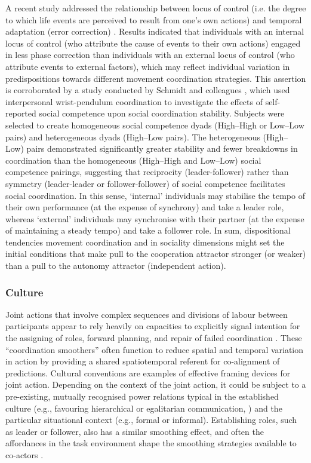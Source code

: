 \begin{CJK}{UTF8}{gbsn}
  A recent study addressed the relationship between locus of control (i.e. the degree to which life events are perceived to result from one’s own actions) and temporal adaptation (error correction) \citep{Fairhurst2014}.   Results indicated that individuals with an internal locus of control (who attribute the cause of events to their own actions) engaged in less phase correction than individuals with an external locus of control (who attribute events to external factors), which may reflect individual variation in predispositions towards different movement coordination strategies.  This assertion is corroborated by a study conducted by Schmidt and colleagues \textcite{Schmidt1994}, which used interpersonal wrist-pendulum coordination to investigate the effects of self-reported social competence \citep{Riggio1996} upon social coordination stability.  Subjects were selected to create homogeneous social competence dyads (High–High or Low–Low pairs) and heterogeneous dyads (High–Low pairs). The heterogeneous (High–Low) pairs demonstrated significantly greater stability and fewer breakdowns in coordination than the homogeneous (High–High and Low–Low) social competence pairings, suggesting that reciprocity (leader-follower) rather than symmetry (leader-leader or follower-follower) of social competence facilitates social coordination.  In this sense,  ‘internal’ individuals may stabilise the tempo of their own performance (at the expense of synchrony) and take a leader role, whereas ‘external’ individuals may synchronise with their partner (at the expense of maintaining a steady tempo) and take a follower role.  In sum,  dispositional tendencies movement coordination and in sociality dimensions might set the initial conditions that make pull to the cooperation attractor stronger (or weaker) than a pull to the autonomy attractor (independent action).


\subsubsection{Culture}

Joint actions that involve complex sequences and divisions of labour between participants appear to rely heavily on capacities to explicitly signal intention for the assigning of roles, forward planning, and repair of failed coordination \citep{Frith2010}.  These ``coordination smoothers'' \citep{Vesper2017} often function to reduce spatial and temporal variation in action by providing a shared spatiotemporal referent for co-alignment of predictions.  Cultural conventions are examples of effective framing devices for joint action.  Depending on the context of the joint action, it could be subject to a pre-existing, mutually recognised power relations typical in the established culture (e.g., favouring hierarchical or egalitarian communication, \citep[see]{Cheon2011}) and the particular situational context (e.g., formal or informal).
Establishing roles, such as leader or follower, also has a similar smoothing effect, and often the affordances in the task environment shape the smoothing strategies available to co-actors \citep{Marsh2009}.


\end{CJK}
